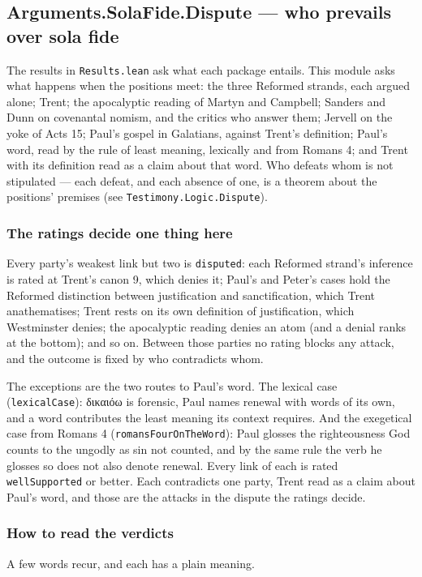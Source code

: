 \documentclass[11pt]{article}
\begin{document}
\subsection*{Arguments.SolaFide.Dispute — who prevails over sola fide}
The results in \texttt{Results.lean} ask what each package entails. This module asks what happens when the positions meet: the three Reformed strands, each argued alone; Trent; the apocalyptic reading of Martyn and Campbell; Sanders and Dunn on covenantal nomism, and the critics who answer them; Jervell on the yoke of Acts 15; Paul's gospel in Galatians, against Trent's definition; Paul's word, read by the rule of least meaning, lexically and from Romans 4; and Trent with its definition read as a claim about that word. Who defeats whom is not stipulated — each defeat, and each absence of one, is a theorem about the positions' premises (see \texttt{Testimony.Logic.Dispute}).

\subsubsection*{The ratings decide one thing here}
Every party's weakest link but two is \texttt{disputed}: each Reformed strand's inference is rated at Trent's canon 9, which denies it; Paul's and Peter's cases hold the Reformed distinction between justification and sanctification, which Trent anathematises; Trent rests on its own definition of justification, which Westminster denies; the apocalyptic reading denies an atom (and a denial ranks at the bottom); and so on. Between those parties no rating blocks any attack, and the outcome is fixed by who contradicts whom.

The exceptions are the two routes to Paul's word. The lexical case (\texttt{lexical\allowbreak{}Case}): δικαιόω is forensic, Paul names renewal with words of its own, and a word contributes the least meaning its context requires. And the exegetical case from Romans 4 (\texttt{romans\allowbreak{}Four\allowbreak{}On\allowbreak{}The\allowbreak{}Word}): Paul glosses the righteousness God counts to the ungodly as sin not counted, and by the same rule the verb he glosses so does not also denote renewal. Every link of each is rated \texttt{well\allowbreak{}Supported} or better. Each contradicts one party, Trent read as a claim about Paul's word, and those are the attacks in the dispute the ratings decide.

\subsubsection*{How to read the verdicts}
A few words recur, and each has a plain meaning.
\end{document}

